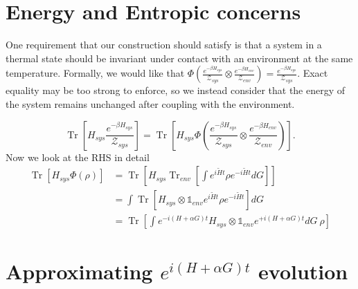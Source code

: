\documentclass{article}
\newcommand{\parens}[1]{\left( #1 \right)}
\newcommand{\brackets}[1]{\left[ #1 \right]}
\newcommand{\openone}{\mathds{1}}
\DeclareMathOperator{\Tr}{Tr}
\newcommand{\trace}[1]{\Tr \brackets{ #1 }}
\newcommand{\partrace}[2]{\Tr_{#1} \brackets{ #2 }}
\newcommand{\partfun}{\mathcal{Z}}
\begin{document}
\section{Energy and Entropic concerns}
One requirement that our construction should satisfy is that a system in a thermal state should be invariant under contact with an environment at the same temperature. Formally, we would like that $\Phi \parens{\frac{e^{-\beta H_{sys}}}{\partfun_{sys}} \otimes \frac{e^{- \beta H_{env}}}{\partfun_{env}}} = \frac{e^{-\beta H_{sys}}}{\partfun_{sys}}$. Exact equality may be too strong to enforce, so we instead consider that the energy of the system remains unchanged after coupling with the environment. 

\begin{equation}
    \trace{H_{sys} \frac{e^{-\beta H_{sys}}}{\partfun_{sys}}} = \trace{H_{sys} \Phi \parens{\frac{e^{-\beta H_{sys}}}{\partfun_{sys}} \otimes \frac{e^{- \beta H_{env}}}{\partfun_{env}}}}.
\end{equation}
Now we look at the RHS in detail
\begin{align}
    \trace{H_{sys} \Phi \parens{\rho} } &= \trace{ H_{sys} \partrace{env}{\int e^{i \widetilde{H} t} \rho e^{-i \widetilde{H} t} dG}} \\
    &= \int \trace{H_{sys} \otimes \openone_{env} e^{i \widetilde{H} t} \rho e^{-i \widetilde{H} t} } dG \\
    &=  \trace{\int e^{- i (H + \alpha G) t} H_{sys} \otimes \openone_{env} e^{+ i (H + \alpha G) t} dG ~ \rho }
\end{align}

\section{Approximating $e^{i (H + \alpha G) t}$ evolution}



\end{document}
